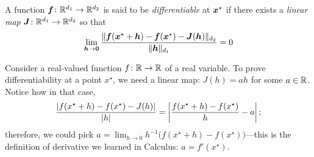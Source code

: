 \begin{definition}\label{def:differentiable}
A function $\boldsymbol{f} \colon \mathbb{R}^{d_1} \to \mathbb{R}^{d_2}$ is said to be \emph{differentiable} at $\boldsymbol{x}^{\star}$ if there exists a \emph{linear map} $\boldsymbol{J} \colon \mathbb{R}^{d_1} \to \mathbb{R}^{d_2}$ so that 
\begin{equation*}
\lim_{\boldsymbol{h} \to \boldsymbol{0}} \frac{\lVert \boldsymbol{f}(\boldsymbol{x}^{\star}+\boldsymbol{h})-\boldsymbol{f}(\boldsymbol{x}^{\star})-\boldsymbol{J}(\boldsymbol{h}) \rVert_{d_2}}{\lVert \boldsymbol{h} \rVert_{d_1}} = 0
\end{equation*}
\end{definition}

 
\begin{example}\label{example:derivatives}
Consider a real-valued function $f\colon \mathbb{R} \to \mathbb{R}$ of a real variable. To prove differentiability at a point $x^\star$, we need a linear map: $J(h)=ah$ for some $a\in \mathbb{R}$. Notice how in that case, 
\begin{equation*}
\frac{\lvert f(x^\star+h)-f(x^\star)-J(h) \rvert}{\lvert h \rvert} = \left\lvert \frac{f(x^\star+h)-f(x^\star)}{h} - a \right\lvert;
\end{equation*}
therefore, we could pick $a = \lim_{h\to 0} h^{-1}\big( f(x^\star+h) - f(x^\star) \big)$---this is the definition of derivative we learned in Calculus: $a=f'(x^\star)$.
\end{example}

